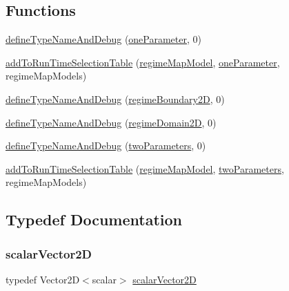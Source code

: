 \subsection*{Functions}
\begin{DoxyCompactItemize}
\item 
\hyperlink{namespaceFoam_1_1regimeMapModels_a2a158634226e0f0f71ebb45c644b0f16}{define\+Type\+Name\+And\+Debug} (\hyperlink{classFoam_1_1regimeMapModels_1_1oneParameter}{one\+Parameter}, 0)
\item 
\hyperlink{namespaceFoam_1_1regimeMapModels_a5cca710ac6ca9856c037c93bbd40aa2e}{add\+To\+Run\+Time\+Selection\+Table} (\hyperlink{classFoam_1_1regimeMapModel}{regime\+Map\+Model}, \hyperlink{classFoam_1_1regimeMapModels_1_1oneParameter}{one\+Parameter}, regime\+Map\+Models)
\item 
\hyperlink{namespaceFoam_1_1regimeMapModels_aaf5d12e884853ed4151ffd657ca9905f}{define\+Type\+Name\+And\+Debug} (\hyperlink{classFoam_1_1regimeMapModels_1_1regimeBoundary2D}{regime\+Boundary2D}, 0)
\item 
\hyperlink{namespaceFoam_1_1regimeMapModels_aad2c8e1ada7500040d8e88e11db904b9}{define\+Type\+Name\+And\+Debug} (\hyperlink{classFoam_1_1regimeMapModels_1_1regimeDomain2D}{regime\+Domain2D}, 0)
\item 
\hyperlink{namespaceFoam_1_1regimeMapModels_a829ba990737d74a279bc5e0932d17715}{define\+Type\+Name\+And\+Debug} (\hyperlink{classFoam_1_1regimeMapModels_1_1twoParameters}{two\+Parameters}, 0)
\item 
\hyperlink{namespaceFoam_1_1regimeMapModels_ae4d2ffaff96dc781f7ac62d7be3b544c}{add\+To\+Run\+Time\+Selection\+Table} (\hyperlink{classFoam_1_1regimeMapModel}{regime\+Map\+Model}, \hyperlink{classFoam_1_1regimeMapModels_1_1twoParameters}{two\+Parameters}, regime\+Map\+Models)
\end{DoxyCompactItemize}


\subsection{Typedef Documentation}
\mbox{\label{namespaceFoam_1_1regimeMapModels_a08598bcd83623145f1ffa4ca0c48b685}} 
\subsubsection{\texorpdfstring{scalar\+Vector2D}{scalarVector2D}}
{\footnotesize\ttfamily typedef Vector2D$<$scalar$>$ \hyperlink{namespaceFoam_1_1regimeMapModels_a08598bcd83623145f1ffa4ca0c48b685}{scalar\+Vector2D}}



